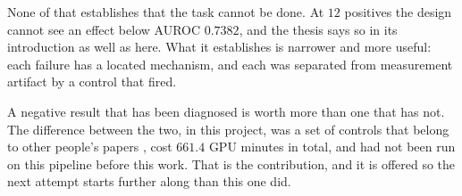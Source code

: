 None of that establishes that the task cannot be done. At $12$ positives the
design cannot see an effect below AUROC $0.7382$, and the thesis says so in its
introduction as well as here. What it establishes is narrower and more useful:
each failure has a located mechanism, and each was separated from measurement
artifact by a control that fired.

A negative result that has been diagnosed is worth more than one that has not.
The difference between the two, in this project, was a set of controls that
belong to other people's papers
\citep{lipsitch2010negative,adebayo2018sanity,hewitt2019control,egami2023surrogates,feinstein1990paradoxes},
cost $661.4$ GPU minutes in total, and had not
been run on this pipeline before this work. That is the contribution, and it is
offered so the next attempt starts further along than this one did.
